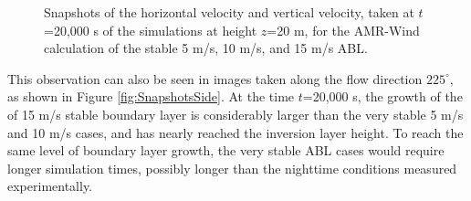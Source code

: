 \begin{figure}[hbt!]
  \caption{ \label{fig:SnapshotsZ20} Snapshots of the horizontal
    velocity and vertical velocity, taken at $t$=20,000 s of the
    simulations at height $z$=20 m, for the AMR-Wind calculation of the
    stable 5 m/s, 10 m/s, and 15 m/s ABL. }
\end{figure}

This observation can also be seen in images taken along the flow
direction $225^\circ$, as shown in Figure
\ref{fig:SnapshotsSide}.  At the time $t$=20,000 s, the growth of the
of 15 m/s stable boundary layer is considerably larger than the very
stable 5 m/s and 10 m/s cases, and has nearly reached the inversion
layer height.  To reach the same level of boundary layer growth, the
very stable ABL cases would require longer simulation times, possibly
longer than the nighttime conditions measured experimentally.


